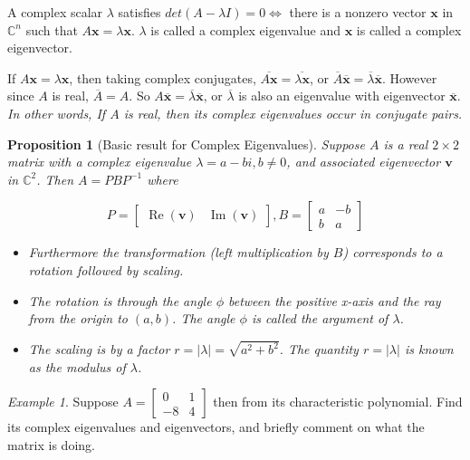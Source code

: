 \documentclass[]{extarticle}
\theoremstyle{Simple}
\newtheorem{prop}[thm]{Proposition}
\theoremstyle{definition}
\theoremstyle{remark}
\theoremstyle{example}
\newtheorem{eg}{Example}[section]
\begin{document}
A complex scalar $\lambda$ satisfies $det(A - \lambda I) = 0 \iff$ there is a nonzero vector $\bm{x}$ in $\mathbb{C}^{n}$ such that $A\bm{x} = \lambda \bm{x}$. $\lambda$ is called a complex eigenvalue and $\bm{x}$ is called a complex eigenvector.

If $A\bm{x} = \lambda \bm{x}$, then taking complex conjugates, $\overline{A\bm{x}} = \overline{\lambda \bm{x}}$, or $\overline{A}\overline{\bm{x}} = \overline{\lambda} \overline{\bm{x}}$. However since $A$ is real, $\overline{A} = A$. So $A\overline{\bm{x}} = \overline{\lambda} \overline{\bm{x}}$, or $\overline{\lambda}$ is also an eigenvalue with eigenvector $\overline{\bm{x}}$. \textit{In other words, If $A$ is real, then its complex eigenvalues occur in conjugate pairs.}

\begin{prop}[Basic result for Complex Eigenvalues]
Suppose $A$ is a real $2 \times 2$ matrix with a complex eigenvalue $\lambda = a - bi, b \neq 0$, and associated eigenvector $\bm{v}$ in $\mathbb{C}^{2}$. Then $A = PBP^{-1}$ where

$$
P =
\begin{bmatrix}
 \operatorname{Re}(\bm{v}) & \operatorname{Im}(\bm{v})
\end{bmatrix}, 
B =
\begin{bmatrix}
a & -b \\
b & a
\end{bmatrix}
$$

\begin{itemize}
\item Furthermore the transformation (left multiplication by $B$) corresponds to a rotation followed by scaling.
\item The rotation is through the angle $\phi$ between the positive x-axis and the ray from the origin to $(a,b)$. The angle $\phi$ is called the \textit{argument} of $\lambda$.
\item The scaling is by a factor $r = |\lambda| = \sqrt{a^{2} + b^{2}}$. The quantity $r = |\lambda|$ is known as the \textit{modulus} of $\lambda$.
\end{itemize}

\end{prop}

\begin{eg}
Suppose $A = \begin{bmatrix} 0 & 1 \\ -8 & 4 \end{bmatrix}$ then from its characteristic polynomial. Find its complex eigenvalues and eigenvectors, and briefly comment on what the matrix is doing.
\end{eg}
\end{document}
